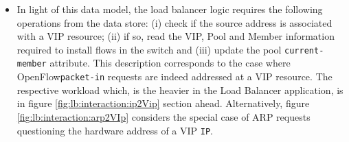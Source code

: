 \begin{figure}[ht]
\TopFloatBoxes
\begin{floatrow}


\end{floatrow}
\end{figure}

\begin{itemize}
\item In light of
this data model, the load balancer logic requires the following
operations from the data store: (i) check if the source address is
associated with a VIP resource; (ii) if so, read the VIP, Pool and
Member information required to install flows in the switch and (iii)
update the pool \texttt{current-member} attribute. This description corresponds to the case where OpenFlow\texttt{packet-in} requests are indeed addressed at a VIP
resource. The respective workload which, is the heavier in
the Load Balancer application, is in figure 
\ref{fig:lb:interaction:ip2Vip} section ahead. Alternatively, figure 
\ref{fig:lb:interaction:arp2VIp}  considers the special case of ARP requests questioning the hardware
address of a VIP \texttt{IP}.
\end{itemize}


